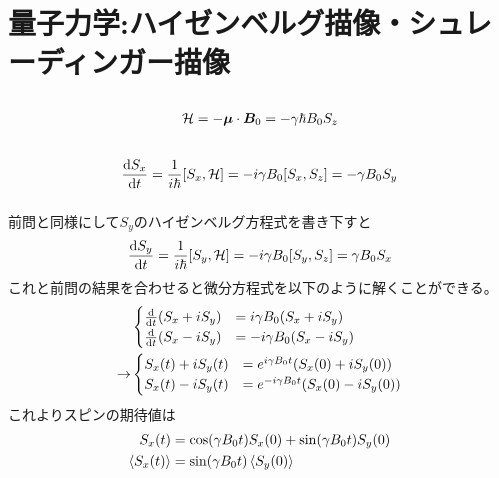 \documentclass[../ap_2010.tex]{subfiles}
\begin{document}
\chapter{量子力学:ハイゼンベルグ描像・シュレーディンガー描像}
\section{}
\begin{equation}\begin{aligned}[b]
    \mathcal{H} = -\vb*{\mu}\cdot \vb*{B}_0 = -\gamma\hbar B_0 S_z
\end{aligned}\end{equation}

\section{}
\subsection{}
\begin{equation}\begin{aligned}[b]
    \dv{S_x}{t}=\frac{1}{i\hbar}\qty[S_x,\mathcal{H}]=-i\gamma B_0\qty[S_x,S_z] = -\gamma B_0S_y
\end{aligned}\end{equation}
\subsection{}
前問と同様にして\(S_y\)のハイゼンベルグ方程式を書き下すと
\begin{equation}\begin{aligned}[b]
    \dv{S_y}{t}=\frac{1}{i\hbar}\qty[S_y,\mathcal{H}]=-i\gamma B_0\qty[S_y,S_z] = \gamma B_0S_x
\end{aligned}\end{equation}
これと前問の結果を合わせると微分方程式を以下のように解くことができる。
\begin{equation}\begin{aligned}[b]
    &\begin{cases}
        \dv{t}\qty(S_x+iS_y)&=i\gamma B_0\qty(S_x+iS_y)\\
        \dv{t}\qty(S_x-iS_y)&=-i\gamma B_0\qty(S_x-iS_y)
    \end{cases}\\
    \rightarrow&\begin{cases}
        S_x(t)+iS_y(t) &= e^{i\gamma B_0t}\qty(S_x(0)+iS_y(0))\\
        S_x(t)-iS_y(t) &= e^{-i\gamma B_0t}\qty(S_x(0)-iS_y(0))
    \end{cases}
\end{aligned}\end{equation}
これよりスピンの期待値は
\begin{equation}\begin{aligned}[b]
    S_x(t)&=\cos(\gamma B_0t)S_x(0)+\sin(\gamma B_0t)S_y(0)\\
    \ev{S_x(t)}&=\sin(\gamma B_0t)\ev{S_y(0)}
\end{aligned}\end{equation}
\end{document}
